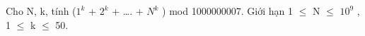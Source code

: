 Cho N, k, tính ($1^{k}$ + $2^{k}$ + …. + $N^{k}$ ) mod 1000000007. Giới hạn 1  $\le$  N  $\le$  $10^{9}$ , 1  $\le$  k  $\le$  50.